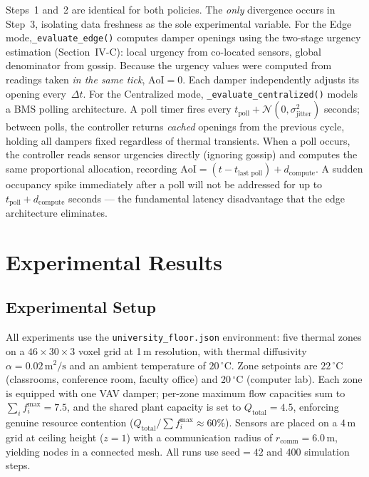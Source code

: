 \documentclass[conference]{IEEEtran}
\begin{document}
Steps~1 and~2 are identical for both policies. The \textit{only} divergence occurs in Step~3, isolating data freshness as the sole experimental variable.
For the Edge mode,\texttt{\_evaluate\_edge()} computes damper openings using the two-stage urgency estimation (Section~IV-C): local urgency from co-located sensors, global denominator from gossip. Because the urgency values were computed from readings taken \textit{in the same tick}, $\text{AoI} = 0$. Each damper independently adjusts its opening every~$\Delta t$. For the Centralized mode, \texttt{\_evaluate\_centralized()} models a BMS polling architecture. A poll timer fires every $t_{\text{poll}} + \mathcal{N}(0, \sigma_{\text{jitter}}^2)$ seconds; between polls, the controller returns \textit{cached} openings from the previous cycle, holding all dampers fixed regardless of thermal transients. When a poll occurs, the controller reads sensor urgencies directly (ignoring gossip) and computes the same proportional allocation, recording $\text{AoI} = (t - t_{\text{last poll}}) + d_{\text{compute}}$. A sudden occupancy spike immediately after a poll will not be addressed for up to $t_{\text{poll}} + d_{\text{compute}}$ seconds --- the fundamental latency disadvantage that the edge architecture eliminates.



\section{Experimental Results}

\subsection{Experimental Setup}

All experiments use the \texttt{university\_floor.json} environment: five
thermal zones on a $46 \times 30 \times 3$ voxel grid at 1\,m resolution,
with thermal diffusivity $\alpha = 0.02\,\text{m}^2/\text{s}$ and an ambient
temperature of $20\,^\circ\text{C}$.  Zone setpoints are
$22\,^\circ\text{C}$ (classrooms, conference room, faculty office) and
$20\,^\circ\text{C}$ (computer lab).  Each zone is equipped with one VAV
damper; per-zone maximum flow capacities sum to $\sum_i f_i^{\max} = 7.5$,
and the shared plant capacity is set to $Q_{\text{total}} = 4.5$, enforcing
genuine resource contention ($Q_{\text{total}} / \sum f_i^{\max} \approx
60\%$).  Sensors are placed on a $4\,\text{m}$ grid at ceiling height
($z = 1$) with a communication radius of $r_{\text{comm}} = 6.0\,\text{m}$,
yielding  nodes in a connected mesh.  All runs use
$\text{seed} = 42$ and 400 simulation steps.
\end{document}
